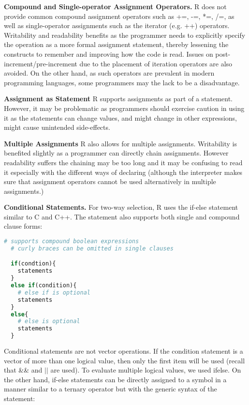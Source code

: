 \documentclass[12pt]{article}
\begin{document}
\textbf{Compound and Single-operator Assignment Operators.} R does not provide common compound assignment operators such as +=, -=, *=, /=, as well as single-operator assignments such as the iterator (e.g. ++) operators. Writability and readability benefits as the programmer needs to explicitly specify the operation as a more formal assignment statement, thereby lessening the constructs to remember and improving how the code is read. Issues on post-increment/pre-increment due to the placement of iteration operators are also avoided. On the other hand, as such operators are prevalent in modern programming languages, some programmers may the lack to be a disadvantage.

\textbf{Assignment as Statement} R supports assignments as part of a statement. However, it may be problematic as programmers should exercise caution in using it as the statements can change values, and might change in other expressions, might cause unintended side-effects.

\textbf{Multiple Assignments} R also allows for multiple assignments. Writability is benefited slightly as a programmer can directly chain assignments. However readability suffers the chaining may be too long and it may be confusing to read it especially with the different ways of declaring (although the interpreter makes sure that assignment operators cannot be used alternatively in multiple assignments.)


\textbf{Conditional Statements.} For two-way selection, R uses the if-else statement similar to C and C++. The statement also supports both single and compound clause forms:

\begin{lstlisting}[language=R, frame=none]
  # supports compound boolean expressions
  # curly braces can be omitted in single clauses

  if(condtion){
    statements
  }
  else if(condition){
    # else if is optional
    statements
  }
  else{
    # else is optional
    statements
  }
\end{lstlisting}

Conditional statements are not vector operations. If the condition statement is a vector of more than one logical value, then only the first item will be used (recall that \&\& and \(||\) are used). To evaluate multiple logical values, we used ifelse. On the other hand, if-else statements can be directly assigned to a symbol in a manner similar to a ternary operator but with the generic syntax of the statement:
\end{document}

